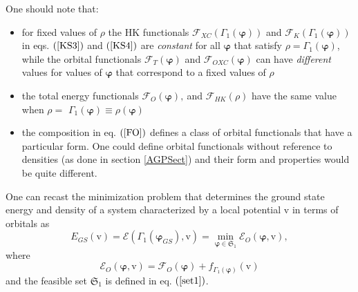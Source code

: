 \documentclass[aps,preprint]{revtex4}%
\begin{document}
One should note that:

\begin{itemize}
\item for fixed values of $\rho$ the HK functionals $\mathcal{F}_{XC}\left(
\Gamma_{1}\left(  \boldsymbol{\varphi}\right)  \right)  $ and $\mathcal{F}%
_{K}\left(  \Gamma_{1}\left(  \boldsymbol{\varphi}\right)  \right)  $ in eqs.
$\left(  \ref{KS3}\right)  $ and $\left(  \ref{KS4}\right)  $ are
\emph{constant} for all $\boldsymbol{\varphi}$ that satisfy $\rho=\Gamma
_{1}\left(  \boldsymbol{\varphi}\right)  $, while the orbital functionals
$\mathcal{F}_{T}\left(  \boldsymbol{\varphi}\right)  $ and $\mathcal{F}%
_{OXC}\left(  \boldsymbol{\varphi}\right)  $ can have \emph{different} values
for values of $\boldsymbol{\varphi}$ that correspond to a fixed values of
$\rho$

\item the total energy functionals $\mathcal{F}_{O}\left(  \boldsymbol{\varphi
}\right)  ,\mathcal{\ }$and $\mathcal{F}_{HK}\left(  \rho\right)  $ have the
same value when $\rho=$ $\Gamma_{1}\left(  \boldsymbol{\varphi}\right)
\equiv\rho\left(  \boldsymbol{\varphi}\right)  $

\item the composition in eq. $\left(  \ref{FO}\right)  $ defines a class of
orbital functionals that have a particular form. One could define orbital
functionals without reference to densities (as done in section \ref{AGPSect})
and their form and properties would be quite different.
\end{itemize}

One can recast the minimization problem that determines the ground state
energy and density of a system characterized by a local potential $\mathrm{v}$
in terms of orbitals as
\begin{equation}
E_{GS}\left(  \mathrm{v}\right)  =\mathcal{E}\left(  \Gamma_{1}\left(
\boldsymbol{\varphi}_{GS}\right)  \boldsymbol{,}\mathrm{v}\right)
=\min_{\boldsymbol{\varphi\in}\mathfrak{S}_{1}}\mathcal{E}_{O}\left(
\boldsymbol{\varphi,}\mathrm{v}\right)  , \label{KSmin}%
\end{equation}
where
\begin{equation}
\mathcal{E}_{O}\left(  \boldsymbol{\varphi,}\mathrm{v}\right)  =\mathcal{F}%
_{O}\left(  \boldsymbol{\varphi}\right)  +f_{\Gamma_{1}\left(
\boldsymbol{\varphi}\right)  }\left(  \mathrm{v}\right)
\end{equation}
and the feasible set $\mathfrak{S}_{1}$ is defined in eq. $\left(
\ref{set1}\right)  $.
\end{document}
